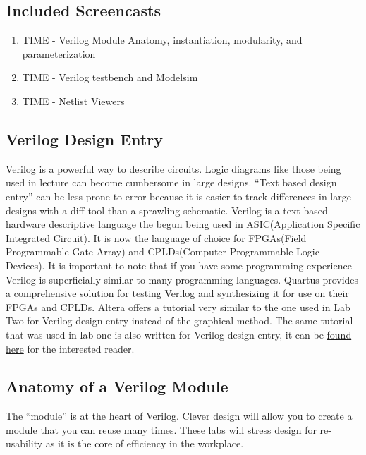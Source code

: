     \subsection{Included Screencasts}
      \begin{enumerate}
        \item TIME - Verilog Module Anatomy, instantiation, modularity, and parameterization
        \item TIME - Verilog testbench and Modelsim
        \item TIME - Netlist Viewers
      \end{enumerate}
    
    \subsection{Verilog Design Entry}
      Verilog is a powerful way to describe circuits. Logic diagrams like those being used in lecture can become cumbersome in large designs. ``Text based design entry'' can be less prone to error because it is easier to track differences in large designs with a diff tool than a sprawling schematic. Verilog is a text based hardware descriptive language the begun being used in ASIC(Application Specific Integrated Circuit). It is now the language of choice for FPGAs(Field Programmable Gate Array) and CPLDs(Computer Programmable Logic Devices). It is important to note that if you have some programming experience Verilog is superficially similar to many programming languages. Quartus provides a comprehensive solution for testing Verilog and synthesizing it for use on their FPGAs and CPLDs. Altera offers a tutorial very similar to the one used in Lab Two for Verilog design entry instead of the graphical method. The same tutorial that was used in lab one is also written for Verilog design entry, it can be \href{ftp://ftp.altera.com/up/pub/Altera_Material/13.0/Tutorials/Verilog/Quartus_II_Introduction.pdf}{found here} for the interested reader.

    \subsection{Anatomy of a Verilog Module}
      The ``module'' is at the heart of Verilog. Clever design will allow you to create a module that you can reuse many times. These labs will stress design for re-usability as it is the core of efficiency in the workplace.
       

